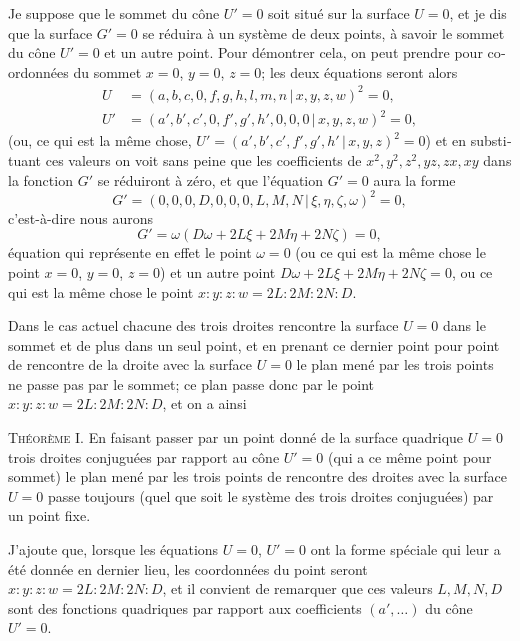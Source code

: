 \documentclass[11pt,a4paper]{article}
\providecommand{\mid}{\,|\,}
\begin{document}
\begin{otherlanguage}{french}
Je suppose que le sommet du c\^one $U' = 0$ soit situ\'e sur la surface $U = 0$, et je dis que la surface $G' = 0$ se r\'eduira \`a un syst\`eme de deux points, \`a savoir le sommet du c\^one $U' = 0$ et un autre point. Pour d\'emontrer cela, on peut prendre pour coordonn\'ees du sommet $x = 0$, $y = 0$, $z = 0$; les deux \'equations seront alors
\[
\begin{aligned}
U  &= (a,  b,  c,  0, f,  g,  h,  l, m, n \mid x, y, z, w)^{2} = 0,\\
U' &= (a', b', c', 0, f', g', h', 0, 0, 0 \mid x, y, z, w)^{2} = 0,
\end{aligned}
\]
(ou, ce qui est la m\^eme chose, $U' = (a', b', c', f', g', h' \mid x, y, z)^{2} = 0$) et en substituant ces valeurs on voit sans peine que les coefficients de $x^{2}, y^{2}, z^{2}, yz, zx, xy$ dans la fonction $G'$ se r\'eduiront \`a z\'ero, et que l'\'equation $G' = 0$ aura la forme
\[
G' = (0, 0, 0, D, 0, 0, 0, L, M, N \mid \xi, \eta, \zeta, \omega)^{2} = 0,
\]
c'est-\`a-dire nous aurons
\[
G' = \omega(D\omega + 2L\xi + 2M\eta + 2N\zeta) = 0,
\]
\'equation qui repr\'esente en effet le point $\omega = 0$ (ou ce qui est la m\^eme chose le point $x = 0$, $y = 0$, $z = 0$) et un autre point $D\omega + 2L\xi + 2M\eta + 2N\zeta = 0$, ou ce qui est la m\^eme chose le point $x : y : z : w = 2L : 2M : 2N : D$.

Dans le cas actuel chacune des trois droites rencontre la surface $U = 0$ dans le sommet et de plus dans un seul point, et en prenant ce dernier point pour point de rencontre de la droite avec la surface $U = 0$ le plan men\'e par les trois points ne passe pas par le sommet; ce plan passe donc par le point $x : y : z : w = 2L : 2M : 2N : D$, et on a ainsi

\medskip
\noindent\textsc{Th\'eor\`eme I.} En faisant passer par un point donn\'e de la surface quadrique $U = 0$ trois droites conjugu\'ees par rapport au c\^one $U' = 0$ (qui a ce m\^eme point pour sommet) le plan men\'e par les trois points de rencontre des droites avec la surface $U = 0$ passe toujours (quel que soit le syst\`eme des trois droites conjugu\'ees) par un point fixe.

\medskip
J'ajoute que, lorsque les \'equations $U = 0$, $U' = 0$ ont la forme sp\'eciale qui leur a \'et\'e donn\'ee en dernier lieu, les coordonn\'ees du point seront $x : y : z : w = 2L : 2M : 2N : D$, et il convient de remarquer que ces valeurs $L, M, N, D$ sont des fonctions quadriques par rapport aux coefficients $(a', \ldots)$ du c\^one $U' = 0$.


\end{otherlanguage}
\end{document}
